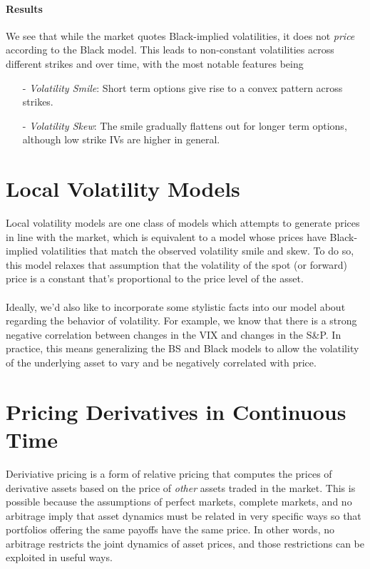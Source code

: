 \documentclass[12pt]{article}
\theoremstyle{plain}
\theoremstyle{definition}
\theoremstyle{remark}
\begin{document}
\paragraph{Results} We see that while the market quotes Black-implied
volatilities, it does not \emph{price} according to the Black model.
This leads to non-constant volatilities across different strikes
and over time, with the most notable features being
\begin{itemize}
   \item[-] {\sl Volatility Smile}: Short term options give rise to
      a convex pattern across strikes.
   \item[-] {\sl Volatility Skew}: The smile gradually flattens
      out for longer term options, although low strike IVs are
      higher in general.
\end{itemize}

\newpage
\section{Local Volatility Models}

Local volatility models are one class of models which attempts to 
generate prices in line with
the market, which is equivalent to a model
whose prices have Black-implied volatilities that match the observed
volatility smile and skew.  To do so, this model relaxes that 
assumption that the volatility of the spot (or forward) price
is a constant that's proportional to the price level of the asset.
\\
\\
Ideally, we'd also like to incorporate some stylistic facts into
our model about regarding the behavior of volatility. For example,
we know that there is a strong negative correlation between
changes in the VIX and changes in the S\&P.  In practice, this means
generalizing the BS and Black models to allow the volatility
of the underlying asset to vary and be negatively correlated with price.


\clearpage
\section{Pricing Derivatives in Continuous Time}

Deriviative pricing is a form of relative pricing that computes the
prices of derivative assets based on the price of \emph{other} assets
traded in the market. This is possible because the assumptions of
perfect markets, complete markets, and no arbitrage imply that asset
dynamics must be related in very specific ways so that portfolios
offering the same payoffs have the same price. In other words, no
arbitrage restricts the joint dynamics of asset prices, and those
restrictions can be exploited in useful ways.
\end{document}
